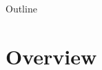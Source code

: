 \documentclass{beamer}
\begin{document}
\begin{frame}   
\titlepage
\end{frame}


\begin{frame}{Outline}
 \tableofcontents
\end{frame}



\section{Overview}




\section{}
\end{document}
